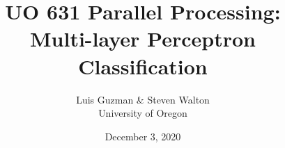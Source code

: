 \documentclass[pdf,11pt]{beamer}
\title{UO 631 Parallel Processing:\\Multi-layer Perceptron Classification
}
\author{Luis Guzman \& Steven Walton\\ \small University of Oregon}
\date{December 3, 2020}
\begin{document}
\frame{\titlepage}









\end{document}

